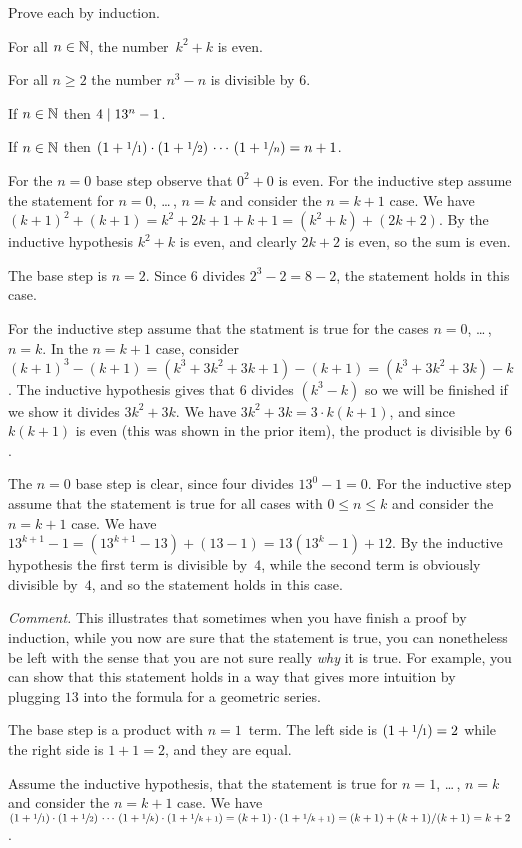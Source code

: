 \documentclass{ibl}
\begin{document}
\begin{ex}
Prove each by induction.
\begin{exes}
\item For all $n\in\mathbb{N}$, the number~$k^2+k$ is even.
\item For all $n\geq 2$ the number $n^3-n$ is divisible by $6$.
\item If $n\in\mathbb{N}$ then $4\mid 13^n-1$.
\item If $n\in\mathbb{N}$ then
    $(1+\sfrac{1}{1})\cdot(1+\sfrac{1}{2})\,\cdots\,(1+\sfrac{1}{n})=n+1$.
\end{exes}
\begin{ans}
\begin{exes}
\item For the $n=0$ base step observe that $0^2+0$ is even.
  For the inductive step assume the statement for $n=0$, \ldots\,, $n=k$
  and consider the $n=k+1$ case.
  We have $(k+1)^2+(k+1)=k^2+2k+1+k+1=(k^2+k)+(2k+2)$. 
  By the inductive hypothesis $k^2+k$ is even, and clearly $2k+2$ is even, 
  so the sum is even.
\item The base step is $n=2$.
  Since $6$ divides $2^3-2=8-2$, the statement holds in this case.

  For the inductive step assume that the statment is true for 
  the cases $n=0$, \ldots\,, $n=k$.
  In the $n=k+1$ case, consider 
  $(k+1)^3-(k+1)=(k^3+3k^2+3k+1)-(k+1)=(k^3+3k^2+3k)-k$.
  The inductive hypothesis gives that $6$ divides $(k^3-k)$ so we will
  be finished if we show it divides  $3k^2+3k$.
  We have $3k^2+3k=3\cdot k(k+1)$, and since
  $k(k+1)$ is even (this was shown in the prior item),
  the product is divisible by $6$.  
\item The $n=0$ base step is clear, since four divides $13^0-1=0$.
  For the inductive step assume that the statement is true for all cases 
  with $0\leq n\leq k$ and consider the $n=k+1$ case.
  We have $13^{k+1}-1=(13^{k+1}-13)+(13-1)=13(13^k-1)+12$.
  By the inductive hypothesis the first term is divisible by~$4$, while the
  second term is obviously divisible by~$4$, and so the statement holds in 
  this case.

  \textit{Comment.}
  This illustrates that 
  sometimes when you have finish a proof by induction, 
  while you now are sure that the statement is true, 
  you can nonetheless be left with the sense
  that you are not sure really \emph{why} it is true.
  For example, you can show that this statement holds in a 
  way that gives more intuition by plugging $13$ into the formula for a
  geometric series. 
\item The base step is a product with $n=1$~term.
  The left side is $(1+\sfrac{1}{1})=2$ while the right side is $1+1=2$,
  and they are equal.

  Assume the inductive hypothesis, that the statement is true for
  $n=1$, \ldots\,, $n=k$ and consider the $n=k+1$ case.
  We have
  $(1+\sfrac{1}{1})\cdot(1+\sfrac{1}{2})\,\cdots\,(1+\sfrac{1}{k})\cdot(1+\sfrac{1}{k+1})
  =
  (k+1)\cdot(1+\sfrac{1}{k+1})
  =(k+1)+(k+1)/(k+1)
  =k+2$.
\end{exes}
\end{ans}
\end{ex}
\end{document}
